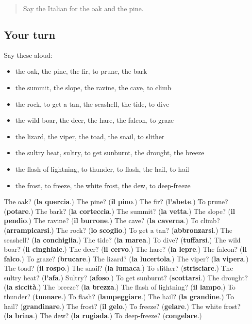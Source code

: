 \label{lesson:IT-R468-ripasso-461-468}



\begin{quote}
Say the Italian for the oak and the pine.
\end{quote}

\subsection*{Your turn}
Say these aloud:

\begin{itemize}
\raggedright
  \item the oak, the pine, the fir, to prune, the bark
  \item the summit, the slope, the ravine, the cave, to climb
  \item the rock, to get a tan, the seashell, the tide, to dive
  \item the wild boar, the deer, the hare, the falcon, to graze
  \item the lizard, the viper, the toad, the snail, to slither
  \item the sultry heat, sultry, to get sunburnt, the drought, the breeze
  \item the flash of lightning, to thunder, to flash, the hail, to hail
  \item the frost, to freeze, the white frost, the dew, to deep-freeze
\end{itemize}

\begin{tcolorbox}[breakable,colback=teal!4,colframe=teal!35!black,title={Before you move on}]
The oak? (\textbf{la quercia}.) The pine? (\textbf{il pino}.) The fir? (\textbf{l'abete}.) To prune? (\textbf{potare}.) The bark? (\textbf{la corteccia}.) The summit? (\textbf{la vetta}.) The slope? (\textbf{il pendio}.) The ravine? (\textbf{il burrone}.) The cave? (\textbf{la caverna}.) To climb? (\textbf{arrampicarsi}.) The rock? (\textbf{lo scoglio}.) To get a tan? (\textbf{abbronzarsi}.) The seashell? (\textbf{la conchiglia}.) The tide? (\textbf{la marea}.) To dive? (\textbf{tuffarsi}.) The wild boar? (\textbf{il cinghiale}.) The deer? (\textbf{il cervo}.) The hare? (\textbf{la lepre}.) The falcon? (\textbf{il falco}.) To graze? (\textbf{brucare}.) The lizard? (\textbf{la lucertola}.) The viper? (\textbf{la vipera}.) The toad? (\textbf{il rospo}.) The snail? (\textbf{la lumaca}.) To slither? (\textbf{strisciare}.) The sultry heat? (\textbf{l'afa}.) Sultry? (\textbf{afoso}.) To get sunburnt? (\textbf{scottarsi}.) The drought? (\textbf{la siccità}.) The breeze? (\textbf{la brezza}.) The flash of lightning? (\textbf{il lampo}.) To thunder? (\textbf{tuonare}.) To flash? (\textbf{lampeggiare}.) The hail? (\textbf{la grandine}.) To hail? (\textbf{grandinare}.) The frost? (\textbf{il gelo}.) To freeze? (\textbf{gelare}.) The white frost? (\textbf{la brina}.) The dew? (\textbf{la rugiada}.) To deep-freeze? (\textbf{congelare}.)
\end{tcolorbox}
